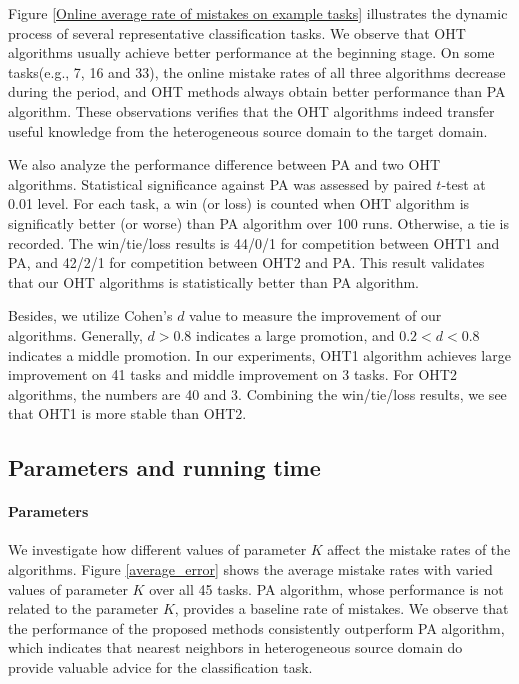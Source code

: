 \documentclass{article} %
\theoremstyle{remark}
\theoremstyle{definition}
\begin{document}
Figure \ref{Online average rate of mistakes on example tasks} illustrates the dynamic process of several representative classification tasks.
We observe that OHT algorithms usually achieve better performance at the beginning stage.
On some tasks(e.g., 7, 16 and 33), the online mistake rates of all three algorithms decrease during the period, and OHT methods always obtain better performance than PA algorithm.
These observations verifies that the OHT algorithms indeed transfer useful knowledge from the heterogeneous source domain to the target domain. 

We also analyze the performance difference between PA and two OHT algorithms.
Statistical significance against PA was assessed by paired $t$-test at 0.01 level.
For each task, a win (or loss) is counted when OHT algorithm is significatly better (or worse) than PA algorithm over 100 runs.
Otherwise, a tie is recorded.
The win/tie/loss results is 44/0/1 for competition between OHT1 and PA, and 42/2/1 for competition between  OHT2 and PA.
This result validates that our OHT algorithms is statistically better than PA algorithm.

Besides, we utilize Cohen's $d$ value to measure the improvement of our algorithms.
Generally, $d>0.8$ indicates a large promotion, and $0.2<d<0.8$ indicates a middle promotion.
In our experiments, OHT1 algorithm achieves large improvement on 41 tasks and middle improvement on 3 tasks.
For OHT2 algorithms, the numbers are 40 and 3.
Combining the win/tie/loss results, we see that OHT1 is more stable than OHT2.


\subsection{Parameters and running time}
\paragraph{Parameters}
We investigate how different values of parameter $K$ affect the mistake rates of the algorithms.
Figure \ref{average_error} shows the average mistake rates with varied values of parameter $K$ over all 45 tasks.
PA algorithm, whose performance is not related to the parameter $K$, provides a baseline rate of mistakes.
We observe that the performance of the proposed methods consistently outperform PA algorithm, which indicates that nearest neighbors in heterogeneous source domain do provide valuable advice for the classification task.
\end{document}
